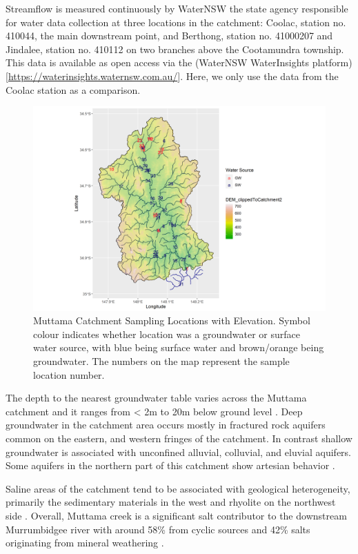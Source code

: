 \documentclass[, manuscript]{copernicus}
\begin{document}
Streamflow is measured continuously by WaterNSW the state agency
responsible for water data collection at three locations in the
catchment: Coolac, station no. 410044, the main downstream point, and
Berthong, station no. 41000207 and Jindalee, station no. 410112 on two
branches above the Cootamundra township. This data is available as open
access via the (WaterNSW WaterInsights
platform){[}\url{https://waterinsights.waternsw.com.au/}{]}. Here, we
only use the data from the Coolac station as a comparison.

\clearpage

\begin{figure}
\includegraphics[width=0.8\linewidth]{Figures/gw_or_sw_map} \caption{Muttama Catchment Sampling Locations with Elevation. Symbol colour indicates whether location was a groundwater or surface water source, with blue being surface water and brown/orange being groundwater. The numbers on the map represent the sample location number.}\label{fig:samplemap}
\end{figure}

The depth to the nearest groundwater table varies across the Muttama
catchment and it ranges from \textless{} 2m to 20m below ground level
\citep{DECC2009}. Deep groundwater in the catchment area occurs mostly
in fractured rock aquifers common on the eastern, and western fringes of
the catchment. In contrast shallow groundwater is associated with
unconfined alluvial, colluvial, and eluvial aquifers. Some aquifers in
the northern part of this catchment show artesian behavior
\citep{Webb1999, Akter2018}.

Saline areas of the catchment tend to be associated with geological
heterogeneity, primarily the sedimentary materials in the west and
rhyolite on the northwest side \citep{Conyers2008}. Overall, Muttama
creek is a significant salt contributor to the downstream Murrumbidgee
river with around 58\% from cyclic sources and 42\% salts originating
from mineral weathering \citep{Conyers2008}.
\end{document}
